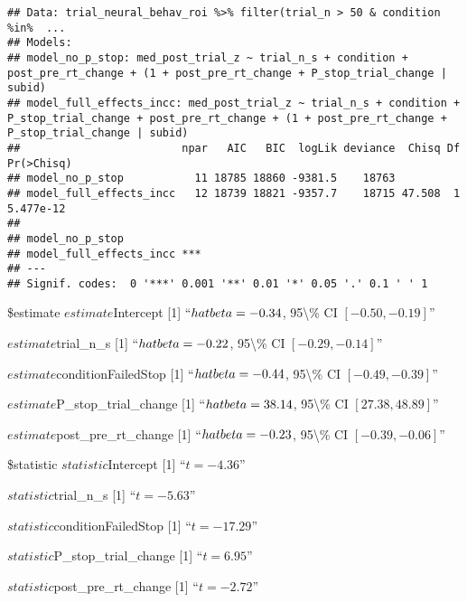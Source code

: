 \documentclass[
  man]{apa6}
\begin{document}
\begin{verbatim}
## Data: trial_neural_behav_roi %>% filter(trial_n > 50 & condition %in%  ...
## Models:
## model_no_p_stop: med_post_trial_z ~ trial_n_s + condition + post_pre_rt_change + (1 + post_pre_rt_change + P_stop_trial_change | subid)
## model_full_effects_incc: med_post_trial_z ~ trial_n_s + condition + P_stop_trial_change + post_pre_rt_change + (1 + post_pre_rt_change + P_stop_trial_change | subid)
##                         npar   AIC   BIC  logLik deviance  Chisq Df Pr(>Chisq)
## model_no_p_stop           11 18785 18860 -9381.5    18763                     
## model_full_effects_incc   12 18739 18821 -9357.7    18715 47.508  1  5.477e-12
##                            
## model_no_p_stop            
## model_full_effects_incc ***
## ---
## Signif. codes:  0 '***' 0.001 '**' 0.01 '*' 0.05 '.' 0.1 ' ' 1
\end{verbatim}

\$estimate
\(estimate\)Intercept
{[}1{]} ``\(\\hat{\\beta} = -0.34\), 95\textbackslash\% CI \([-0.50, -0.19]\)''

\(estimate\)trial\_n\_s
{[}1{]} ``\(\\hat{\\beta} = -0.22\), 95\textbackslash\% CI \([-0.29, -0.14]\)''

\(estimate\)conditionFailedStop
{[}1{]} ``\(\\hat{\\beta} = -0.44\), 95\textbackslash\% CI \([-0.49, -0.39]\)''

\(estimate\)P\_stop\_trial\_change
{[}1{]} ``\(\\hat{\\beta} = 38.14\), 95\textbackslash\% CI \([27.38, 48.89]\)''

\(estimate\)post\_pre\_rt\_change
{[}1{]} ``\(\\hat{\\beta} = -0.23\), 95\textbackslash\% CI \([-0.39, -0.06]\)''

\$statistic
\(statistic\)Intercept
{[}1{]} ``\(t = -4.36\)''

\(statistic\)trial\_n\_s
{[}1{]} ``\(t = -5.63\)''

\(statistic\)conditionFailedStop
{[}1{]} ``\(t = -17.29\)''

\(statistic\)P\_stop\_trial\_change
{[}1{]} ``\(t = 6.95\)''

\(statistic\)post\_pre\_rt\_change
{[}1{]} ``\(t = -2.72\)''
\end{document}
